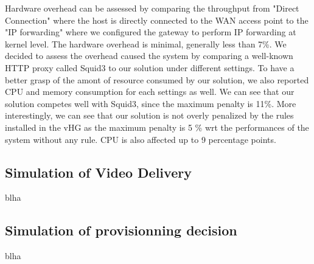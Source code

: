 Hardware overhead can be assessed by comparing the throughput from "Direct Connection" where the host is directly connected to the WAN access point to the "IP forwarding" where we configured the gateway to perform IP forwarding at kernel level. The hardware overhead is minimal, generally less than 7\%.
We decided to assess the overhead caused the system by comparing a well-known HTTP proxy called Squid3 to our solution under different settings. To have a better grasp of the amont of resource consumed by our solution, we also reported CPU and memory consumption for each settings as well.
We can see that our solution competes well with Squid3, since the maximum penalty is 11\%. More interestingly, we can see that our solution is not overly penalized by the rules installed in the vHG as the maximum penalty is 5 \% wrt the performances of the system without any rule. CPU is also affected up to 9 percentage points.

\subsection{Simulation of Video Delivery} \label{videodelivery}

blha

\subsection{Simulation of provisionning decision} \label{provisionningdecisions}

blha





